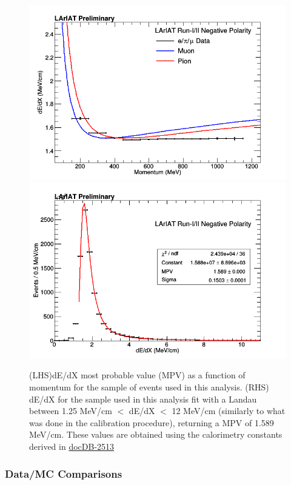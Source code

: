 \begin{figure}[h!]
\centering
\includegraphics[scale=0.33]{./images/dEdXvsMomentumCombined.png}
\includegraphics[scale=0.33]{./images/dEdXDataFit.png}
\caption{(LHS)dE/dX most probable value (MPV) as a function of momentum for the sample of events used in this analysis. (RHS) dE/dX for the sample used in this analysis fit with a Landau between 1.25 MeV/cm $<$ dE/dX $<$ 12 MeV/cm (similarly to what was done in the calibration procedure), returning a MPV of 1.589 MeV/cm. These values are obtained using the calorimetry constants derived in \href{https://lartpc-docdb.fnal.gov:441/cgi-bin/ShowDocument?docid=2513}{docDB-2513}}
\label{fig:dEdXvsMomentum}
\end{figure}

\newpage
\subsubsection{Data/MC Comparisons} \label{sec:DataMCCompare}

